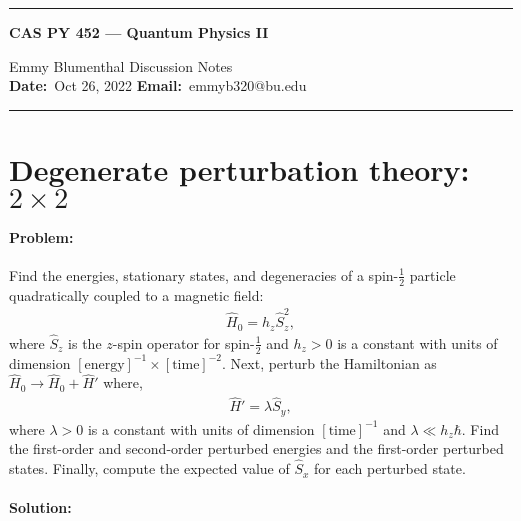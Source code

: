 \documentclass[10pt]{article}
\newcommand{\1}{\mathbf 1}
\begin{document}
\begin{center}
	\hrule
	\vspace{.4cm}
	{\textbf { \large CAS PY 452 --- Quantum Physics II}}
\end{center}
Emmy Blumenthal \hspace{\fill} \hspace{\fill}  \textbf{} Discussion Notes\  \\
\textbf{Date:}\  Oct 26, 2022   \hspace{\fill} \textbf{Email:}\ emmyb320@bu.edu 
\vspace{.4cm}
\hrule





\section*{Degenerate perturbation theory: $2 \times 2$}

\paragraph{Problem:}

Find the energies, stationary states, and degeneracies of a spin-$\frac{1}{2}$ particle quadratically coupled to a magnetic field:
\begin{align}
	\hat H_0 = h_z \hat S_z^2,
\end{align}
where $\hat S_z$ is the $z$-spin operator for spin-$\frac{1}{2}$ and $h_z > 0$ is a constant with units of dimension $[\text{energy}]^{-1} \times [\text{time}]^{-2}$.
Next, perturb the Hamiltonian as $\hat H_0 \to \hat H_0 + \hat H'$ where,
\begin{align}
	\hat H' = \lambda \hat S_y,
\end{align}
where $\lambda > 0$ is a constant with units of dimension $[\text{time}]^{-1}$ and $\lambda \ll h_z \hbar$.
Find the first-order and second-order perturbed energies and the first-order perturbed states.
Finally, compute the expected value of $\hat S_x$ for each perturbed state.

\paragraph{Solution:}
\end{document}
